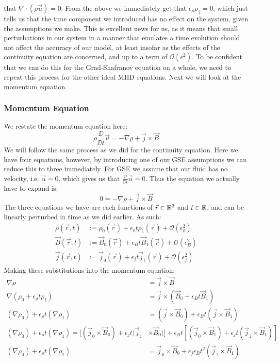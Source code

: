 that $\nabla \cdot (\rho \vec{u}) = 0$. From the above we immediately get that $\epsilon_\rho \rho_1 = 0$, which just tells us that the time component 
we introduced has no effect on the system, given the assumptions we make. This is excellent news for us, as it means that small perturbations 
in our system in a manner that emulates a time evolution should not affect the accuracy of our model, at least insofar as the effects of the 
continuity equation are concerned, and up to a term of $\mathcal{O}(\epsilon^2)$. To be confident that we can do this for the Grad-Shafranov equation on a whole, we need to repeat this process for 
the other ideal MHD equations. Next we will look at the momentum equation.

\subsubsection{Momentum Equation}
We restate the momentum equation here:
\begin{equation*}
    \rho \frac{\DD}{\DD t}\vec{u} = -\nabla \rho + \vec{j} \times \vec{B}
\end{equation*}
We will follow the same process as we did for the continuity equation. Here we have four equations, however, by introducing one of 
our GSE assumptions we can reduce this to three immediately. For GSE we assume that our fluid has no velocity, i.e. $\vec{u} = 0$, which 
gives us that $\frac{\DD}{\DD t} \vec{u} = 0$. Thus the equation we actually have to expand is:
\begin{equation*}
    0 = -\nabla \rho + \vec{j} \times \vec{B}
\end{equation*}
The three equations we have are each functions of $\vec{r} \in \mathbb{R}^3$ and $t \in \mathbb{R}$, and can be linearly perturbed in time as we did earlier. As such:
\begin{align*}
    \rho(\vec{r}, t) &:= \rho_0(\vec{r}) + \epsilon_\rho t \rho_1(\vec{r}) + \mathcal{O}(\epsilon_\rho^2) \\
    \vec{B}(\vec{r}, t) &:= \vec{B}_0(\vec{r}) + \epsilon_B t \vec{B}_1(\vec{r}) + \mathcal{O}(\epsilon_B^2) \\
    \vec{j}(\vec{r}, t) &:= \vec{j}_0(\vec{r}) + \epsilon_j t \vec{j}_1(\vec{r}) + \mathcal{O}(\epsilon_j^2)
\end{align*}
Making these substitutions into the momentum equation:
\begin{align*}
    \nabla \rho &= \vec{j} \times \vec{B} \\
    \nabla (\rho_0 + \epsilon_\rho t \rho_1) &= \vec{j} \times (\vec{B}_0 + \epsilon_B t \vec{B}_1) \\
    (\nabla \rho_0) + \epsilon_\rho t (\nabla \rho_1) &= (\vec{j} \times \vec{B}_0) + \epsilon_B t (\vec{j} \times \vec{B}_1) \\
    (\nabla \rho_0) + \epsilon_\rho t (\nabla \rho_1) = [(\vec{j}_0 \times \vec{B}_0) + \epsilon_j t (\vec{j}_1 &\times \vec{B}_0)] + \epsilon_B t [(\vec{j}_0 \times \vec{B}_1) + \epsilon_j t (\vec{j}_1 \times \vec{B}_1)] \\
    (\nabla \rho_0) + \epsilon_\rho t (\nabla \rho_1) &= \vec{j}_0 \times \vec{B}_0 + \epsilon_j \epsilon_B t^2 (\vec{j}_1 \times \vec{B}_1)
\end{align*}
